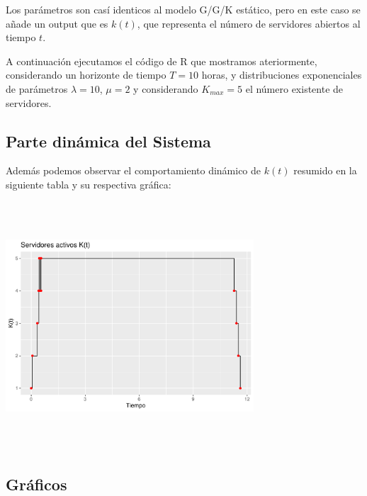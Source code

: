 \documentclass[]{article}
\begin{document}
Los parámetros son casí identicos al modelo G/G/K estático, pero en este
caso se añade un output que es \(k(t)\), que representa el número de
servidores abiertos al tiempo \(t\).

A continuación ejecutamos el código de R que mostramos ateriormente,
considerando un horizonte de tiempo \(T=10\) horas, y distribuciones
exponenciales de parámetros \(\lambda=10\), \(\mu=2\) y considerando
\(K_{max}=5\) el número existente de servidores.

\subsection{Parte dinámica del
Sistema}\label{parte-dinamica-del-sistema}

Además podemos observar el comportamiento dinámico de \(k(t)\) resumido
en la siguiente tabla y su respectiva gráfica:

\begin{center}\includegraphics[width=350px,height=350px]{sistema_dinamico_files/figure-latex/unnamed-chunk-8-1} \end{center}

\subsection{Gráficos}\label{graficos-1}
\end{document}
